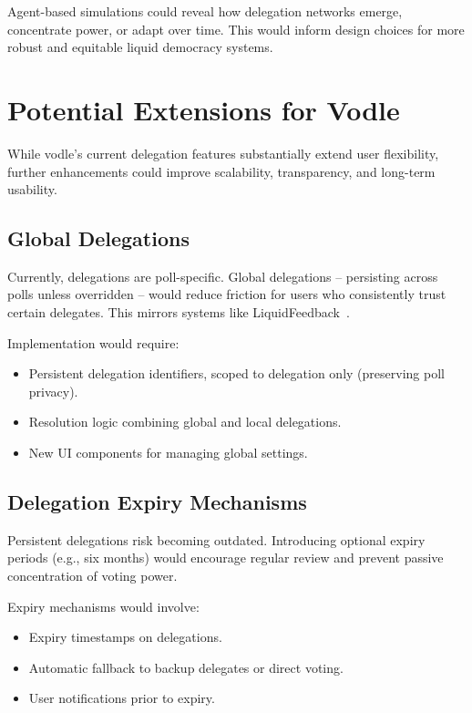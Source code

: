 Agent-based simulations could reveal how delegation networks emerge, concentrate power, or adapt over time. This would inform design choices for more robust and equitable liquid democracy systems.

\section{Potential Extensions for Vodle}

While vodle's current delegation features substantially extend user flexibility, further enhancements could improve scalability, transparency, and long-term usability.

\subsection{Global Delegations}

Currently, delegations are poll-specific. Global delegations -- persisting across polls unless overridden -- would reduce friction for users who consistently trust certain delegates. This mirrors systems like LiquidFeedback~\citep{behrens_liquidfeedback_2014}.

Implementation would require:

\begin{itemize}
    \item Persistent delegation identifiers, scoped to delegation only (preserving poll privacy).
    \item Resolution logic combining global and local delegations.
    \item New UI components for managing global settings.
\end{itemize}

\subsection{Delegation Expiry Mechanisms}

Persistent delegations risk becoming outdated. Introducing optional expiry periods (e.g., six months) would encourage regular review and prevent passive concentration of voting power.

Expiry mechanisms would involve:

\begin{itemize}
    \item Expiry timestamps on delegations.
    \item Automatic fallback to backup delegates or direct voting.
    \item User notifications prior to expiry.
\end{itemize}

